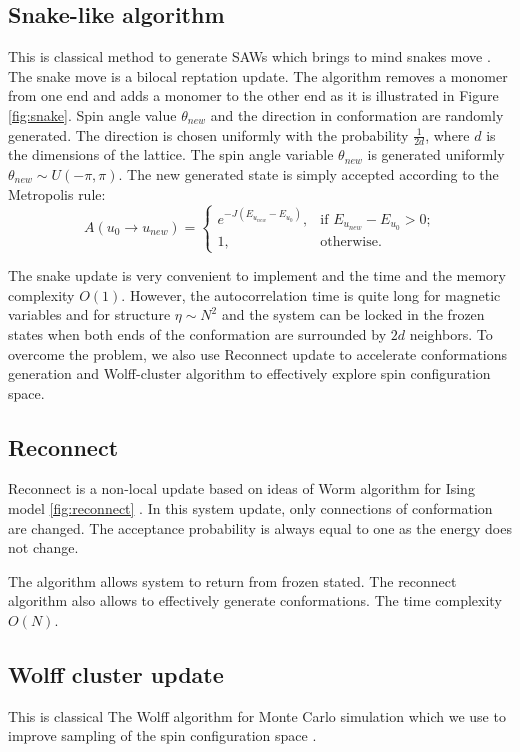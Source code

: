 \subsection{Snake-like algorithm} \label{sec:snake}
This is classical method to generate SAWs which brings to mind snakes move  \cite{Binder2010}. The snake move is a bilocal reptation update. The algorithm removes a monomer from one end and adds a monomer to the other end as it is illustrated in Figure \ref{fig:snake}. Spin angle value $\theta_{new}$ and the direction in conformation are randomly generated. The direction is chosen uniformly with the probability $\frac{1}{2d}$, where $d$ is the dimensions of the lattice. The spin angle variable $\theta_{new}$ is generated uniformly $\theta_{new} \sim U(-\pi, \pi)$. The new generated state is simply accepted  according to the Metropolis rule:
\begin{equation}
\label{accratios}
A(u_0  \rightarrow u_{new} ) =  
\begin{cases}
e^{-J(E_{u_{new}}-E_{u_0})}, & \text{if $E_{u_{new}}-E_{u_0}>0$;}\\
1, & \text{otherwise}.
\end{cases}
\end{equation}

The snake update is very convenient to implement and the time and the  memory complexity $O(1)$. However, the autocorrelation time is quite long for magnetic variables and for structure  $ \eta \sim N^2 $ and the system can be locked in the frozen states when both ends of the conformation are surrounded by $2d$ neighbors. To overcome the problem, we also use Reconnect update to accelerate conformations generation and Wolff-cluster algorithm to effectively explore spin configuration space. 


\subsection{Reconnect}


Reconnect is a non-local update based on ideas of Worm algorithm for Ising model \ref{fig:reconnect} \cite{Worm}.   In this system update, only connections of conformation are changed. The acceptance probability is always equal to one as the energy does not change. 

The algorithm allows system to return from frozen stated. The reconnect algorithm also allows to effectively generate conformations. The time complexity $O(N)$.  

\subsection{Wolff cluster update}
This is classical The Wolff algorithm for Monte Carlo simulation which we use to improve sampling of the spin configuration space  \cite{wolff}. 


